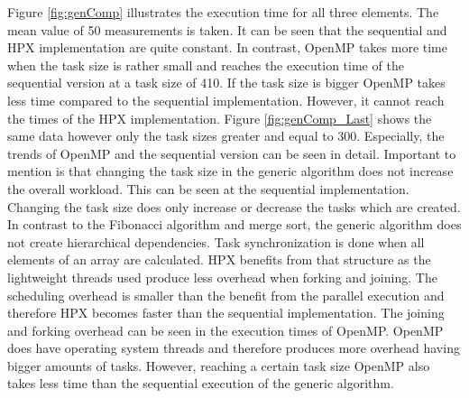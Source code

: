 Figure \ref{fig:genComp} illustrates the execution time for all three elements.
The mean value of 50 measurements is taken.
It can be seen that the sequential and HPX implementation are quite constant.
In contrast, OpenMP takes more time when the task size is rather small and reaches the execution time of the sequential version at a task size of 410.
If the task size is bigger OpenMP takes less time compared to the sequential implementation.
However, it cannot reach the times of the HPX implementation.
Figure \ref{fig:genComp_Last} shows the same data however only the task sizes greater and equal to 300.
Especially, the trends of OpenMP and the sequential version can be seen in detail.
Important to mention is that changing the task size in the generic algorithm does not increase the overall workload.
This can be seen at the sequential implementation.
Changing the task size does only increase or decrease the tasks which are created.
In contrast to the Fibonacci algorithm and merge sort, the generic algorithm does not create hierarchical dependencies.
Task synchronization is done when all elements of an array are calculated.
HPX benefits from that structure as the lightweight threads used produce less overhead when forking and joining.
The scheduling overhead is smaller than the benefit from the parallel execution and therefore HPX becomes faster than the sequential implementation.
The joining and forking overhead can be seen in the execution times of OpenMP.
OpenMP does have operating system threads and therefore produces more overhead having bigger amounts of tasks.
However, reaching a certain task size OpenMP also takes less time than the sequential execution of the generic algorithm.


